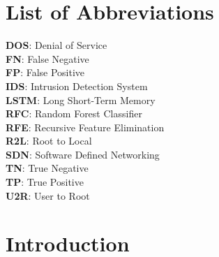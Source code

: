 \chapter*{List of Abbreviations}
\textbf{DOS}: Denial of Service\\
\textbf{FN}: False  Negative \\
\textbf{FP}: False Positive\\
\textbf{IDS}: Intrusion Detection System\\
\textbf{LSTM}: Long Short-Term Memory\\
\textbf{RFC}: Random Forest Classifier\\
\textbf{RFE}: Recursive Feature Elimination\\
\textbf{R2L}: Root to Local \\
\textbf{SDN}: Software Defined Networking \\
\textbf{TN}: True Negative\\
\textbf{TP}: True Positive\\
\textbf{U2R}: User to Root\\


\newpage
{} %

\chapter{Introduction}
\vspace{-18pt}
